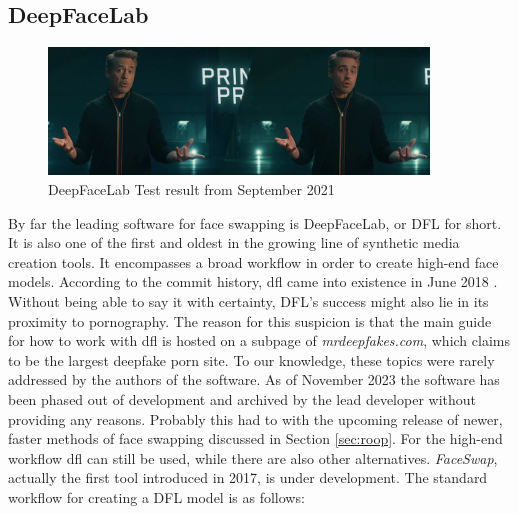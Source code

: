 \documentclass[
  a4paper,  %
  twoside,  %
  bibliography=totoc,
  headsepline,
  cleardoublepage=empty,
  parskip=half,
  draft=false
]{scrbook}
\begin{document}
\subsection{DeepFaceLab}
\begin{figure}[h]
  \centering
  \includegraphics[width=0.9\textwidth]{./graphics/images/dfl-demo.png}
  \caption{DeepFaceLab Test result from September 2021}
  \label{fig:dfl-sample}
\end{figure}
By far the leading software for face swapping is DeepFaceLab, or DFL for short. It is also one of the first and oldest in the growing line of synthetic media creation tools. It encompasses a broad workflow in order to create high-end face models. According to the commit history, \gls{dfl} came into existence in June 2018 \cite{iperovCommitsIperovDeepFaceLab}. Without being able to say it with certainty, DFL's success might also lie in its proximity to pornography. The reason for this suspicion is that the main guide for how to work with \gls{dfl} is hosted on a subpage of \textit{mrdeepfakes.com}, which claims to be the largest deepfake porn site. To our knowledge, these topics were rarely addressed by the authors of the software. As of November 2023 the software has been phased out of development and archived by the lead developer without providing any reasons. Probably this had to with the upcoming release of newer, faster methods of face swapping discussed in Section \ref{sec:roop}. For the high-end workflow \gls{dfl} can still be used, while there are also other alternatives. \textit{FaceSwap}, actually the first tool introduced in 2017, is under development. The standard workflow for creating a DFL model is as follows:
\end{document}
